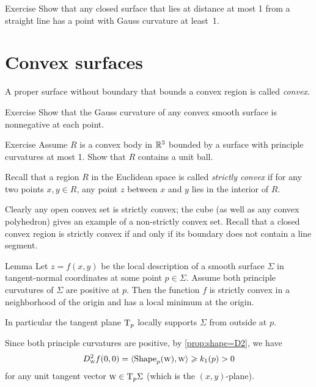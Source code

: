 \begin{thm}{Exercise}\label{ex:positive-gauss}
Show that any closed surface that lies at distance at most 1 from a straight line has a point with Gauss curvature at least~1.
\end{thm}

\section{Convex surfaces}

A proper surface without boundary that bounds a convex region is called \emph{convex}.

\begin{thm}{Exercise}\label{ex:convex-surf}
Show that the Gauss curvature of any convex smooth surface is nonnegative at each point.
\end{thm}

\begin{thm}{Exercise}\label{ex:convex-lagunov}
Assume $R$ is a convex body in $\mathbb{R}^3$ bounded by a surface with principle curvatures at most 1.
Show that $R$ contains a unit ball.
\end{thm}

Recall that a region $R$ in the Euclidean space is called  \emph{strictly convex} if for any two points $x,y\in R$, any point $z$ between $x$ and $y$ lies in the interior of $R$.

Clearly any open convex set is strictly convex;
the cube (as well as any convex polyhedron) gives an example of a non-strictly convex set.
Recall that a closed convex region is strictly convex if and only if its boundary does not contain a line segment.

\begin{thm}{Lemma}\label{lem:gauss+=>convexity}
Let $z=f(x,y)$ be the local description of a smooth surface $\Sigma$ in tangent-normal coordinates at some point $p\in\Sigma$.
Assume both principle curvatures of $\Sigma$ are positive at $p$.
Then the function $f$ is strictly convex in a neighborhood of the origin and has a local minimum at the origin.

In particular the tangent plane $\mathrm{T}_p$ locally supports $\Sigma$ from outside at $p$.
\end{thm}

Since both principle curvatures are positive, by \ref{prop:shape=D2}, we have 
\[D^2_{\text{\sc{w}}}f(0,0)=\langle \mathop{\rm Shape}\nolimits_p({\text{\sc{w}}}),{\text{\sc{w}}}\rangle\geqslant k_1(p)>0\] 
for any unit tangent vector ${\text{\sc{w}}}\in\mathrm{T}_p\Sigma$ (which is the $(x,y)$-plane).

